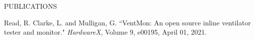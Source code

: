 \documentclass[11pt]{article}
\begin{document}
\vspace{0.25cm}






\clearpage
\hrulefill

PUBLICATIONS

\vspace{0.25cm}

Read, R. Clarke, L. and Mulligan, G. ``VentMon: An open source inline ventilator tester and monitor." \textit{HardwareX}, Volume 9, e00195, April 01, 2021.
\end{document}
